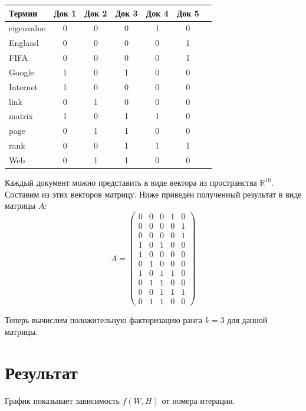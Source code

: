 \begin{center}
 \begin{tabular}{ l | c c c c c c }
 Термин      & Док 1 & Док 2 & Док 3 & Док 4 & Док 5 \\
 \hline
 eigenvalue  & 0 & 0 & 0 & 1 & 0 \\
 England     & 0 & 0 & 0 & 0 & 1 \\
 FIFA        & 0 & 0 & 0 & 0 & 1 \\
 Google      & 1 & 0 & 1 & 0 & 0 \\
 Internet    & 1 & 0 & 0 & 0 & 0 \\
 link        & 0 & 1 & 0 & 0 & 0 \\
 matrix      & 1 & 0 & 1 & 1 & 0 \\
 page        & 0 & 1 & 1 & 0 & 0 \\
 rank        & 0 & 0 & 1 & 1 & 1 \\
 Web         & 0 & 1 & 1 & 0 & 0 \\
\end{tabular}
\end{center}


\newpage


Каждый документ можно представить в виде вектора из пространства $\mathbb{R}^{10}$. Составим из этих векторов матрицу. Ниже приведён полученный результат в виде матрицы $A$:
$$
A =
\begin{pmatrix}
0 & 0 & 0 & 1 & 0 \\
0 & 0 & 0 & 0 & 1 \\
0 & 0 & 0 & 0 & 1 \\
1 & 0 & 1 & 0 & 0 \\
1 & 0 & 0 & 0 & 0 \\
0 & 1 & 0 & 0 & 0 \\
1 & 0 & 1 & 1 & 0 \\
0 & 1 & 1 & 0 & 0 \\
0 & 0 & 1 & 1 & 1 \\
0 & 1 & 1 & 0 & 0
\end{pmatrix}
$$

Теперь вычислим положительную факторизацию ранга $k=3$ для данной матрицы.

\newpage


\section{Результат}

График показывает зависимость $f(W, H)$ от номера итерации.

